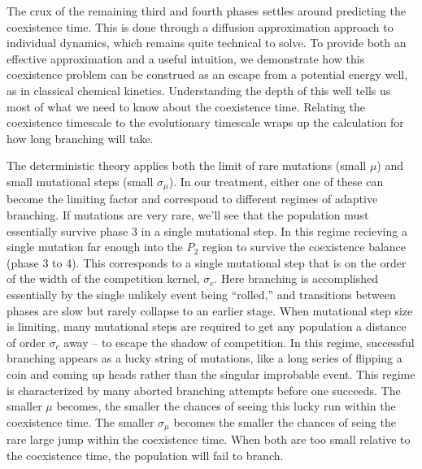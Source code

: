 \documentclass[authoryear,review,11pt]{elsarticle}
\begin{document}
The crux of the remaining third and fourth phases settles around predicting the coexistence time.  This is done through a diffusion approximation approach to individual dynamics, which remains quite technical to solve.  To provide both an effective approximation and a useful intuition, we demonstrate how this coexistence problem can be construed as an escape from a potential energy well, as in classical chemical kinetics.  Understanding the depth of this well tells us most of what we need to know about the coexistence time.  Relating the coexistence timescale to the evolutionary timescale wraps up the calculation for how long branching will take.  

The deterministic theory applies both the limit of rare mutations (small $\mu$) and small mutational steps (small $\sigma_{\mu}$).  In our treatment, either one of these can become the limiting factor and correspond to different regimes of adaptive branching.  If mutations are very rare, we'll see that the population must essentially survive phase 3 in a single mutational step.  In this regime recieving a single mutation far enough into the $P_2$ region to survive the coexistence balance (phase 3 to 4).  This corresponds to a single mutational step that is on the order of the width of the competition kernel, $\sigma_c$.  Here branching is accomplished essentially by the single unlikely event being ``rolled,'' and transitions between phases are slow but rarely collapse to an earlier stage.  When mutational step size is limiting, many mutational steps are required to get any population a distance of order $\sigma_c$ away -- to escape the shadow of competition.  In this regime, successful branching appears as a lucky string of mutations, like a long series of flipping a coin and coming up heads rather than the singular improbable event.  This regime is characterized by many aborted branching attempts before one succeeds.  The smaller $\mu$ becomes, the smaller the chances of seeing this lucky run within the coexistence time.  The smaller $\sigma_{\mu}$ becomes the smaller the chances of seing the rare large jump within the coexistence time.  When both are too small relative to the coexistence time, the population will fail to branch.  
\end{document}
